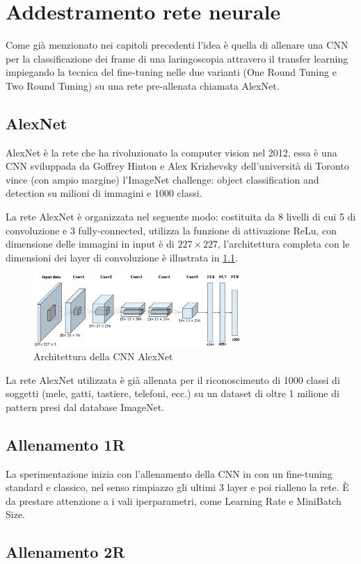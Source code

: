 \chapter{Addestramento rete neurale}\label{addestramento-rete-neurale}


Come già menzionato nei capitoli precedenti l’idea è quella di allenare una  CNN per la classificazione dei frame di una laringoscopia attravero il transfer learning impiegando la tecnica del
fine-tuning nelle due varianti (One Round Tuning e Two Round Tuning)  su una rete pre-allenata chiamata AlexNet.

\section{AlexNet}\label{alexnet}
AlexNet è la rete che ha rivoluzionato la computer vision nel 2012, essa è una CNN sviluppada
da Goffrey Hinton e Alex Krizhevsky dell’università di Toronto vince (con ampio margine)
l’ImageNet challenge: object classification and detection su milioni di immagini e 1000 classi.

La rete AlexNet è organizzata nel seguente modo: costituita da 8 livelli di cui 5 di \gls{convoluzione} e 3 \gls{fully-connected}, utilizza la funzione
di attivazione \gls{ReLu}, con dimensione delle immagini in input è di \(227\times 227\), l'architettura completa con le dimensioni dei layer di \gls{convoluzione} è illustrata in \cref{fig:alexnet}\cite{alexnet}.  

\begin{figure}[ht]
    \centering
    \includegraphics[width=0.7\textwidth]{addestramento-rete-neurale/alexnet.png}
    \caption{Architettura della CNN AlexNet}
    \label{fig:alexnet}
\end{figure}

La rete AlexNet utilizzata è già allenata per il riconoscimento di 1000 classi di soggetti (mele, gatti, tastiere, telefoni, ecc.) su un dataset di oltre 1 milione di pattern presi dal database ImageNet\cite{alexnet}.

\section{Allenamento 1R}\label{allenamento-1r}

La sperimentazione inizia con l'allenamento della CNN in con un fine-tuning standard e classico, nel senso rimpiazzo gli ultimi 3 layer e poi rialleno la rete. È da prestare attenzione a i vali iperparametri, come Learning Rate e MiniBatch Size.

\section{Allenamento 2R}\label{allenamento-2r}
